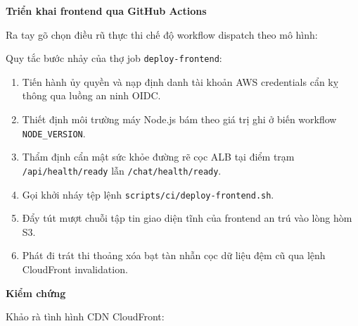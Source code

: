 \vspace{0.5em}\noindent\textbf{Triển khai frontend qua GitHub
Actions}\par

Ra tay gõ chọn điều rũ thực thi chế độ workflow dispatch theo mô hình:

\begin{Shaded}
\begin{Highlighting}[]
\end{Highlighting}
\end{Shaded}

Quy tắc bước nhảy của thợ job \texttt{deploy-\allowbreak{}frontend}:

\begin{enumerate}
\def\labelenumi{\arabic{enumi}.}
\tightlist
\item
  Tiến hành ủy quyền và nạp định danh tài khoản AWS credentials cẩn kỵ
  thông qua luồng an ninh OIDC.
\item
  Thiết định môi trường máy Node.js bám theo giá trị ghi ở biến workflow
  \texttt{NODE\_\allowbreak{}VERSION}.
\item
  Thẩm định cẩn mật sức khỏe đường rẽ cọc ALB tại điểm trạm
  \texttt{/\allowbreak{}api/\allowbreak{}health/\allowbreak{}ready} lẫn \texttt{/\allowbreak{}chat/\allowbreak{}health/\allowbreak{}ready}.
\item
  Gọi khởi nháy tệp lệnh \texttt{scripts/\allowbreak{}ci/\allowbreak{}deploy-\allowbreak{}frontend.\allowbreak{}sh}.
\item
  Đẩy tút mượt chuỗi tập tin giao diện tĩnh của frontend an trú vào lòng
  hòm S3.
\item
  Phát đi trát thi thoảng xóa bạt tàn nhẫn cọc dữ liệu đệm cũ qua lệnh
  CloudFront invalidation.
\end{enumerate}

\vspace{0.5em}\noindent\textbf{Kiểm chứng}\par

Khảo rà tình hình CDN CloudFront:

\begin{Shaded}
\begin{Highlighting}[]
 
 
 
\end{Highlighting}
\end{Shaded}

